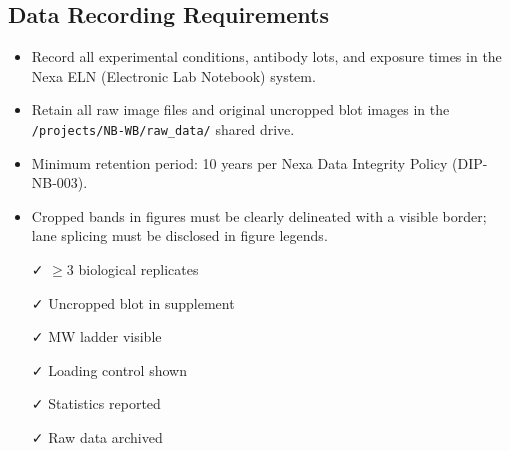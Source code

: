 \begin{minipage}[t]{0.55\textwidth}
\vspace{0pt}
\subsection*{Data Recording Requirements}
\begin{itemize}
  \item Record all experimental conditions, antibody lots, and exposure times
        in the Nexa ELN (Electronic Lab Notebook) system.
  \item Retain all raw image files and original uncropped blot images in
        the \texttt{/projects/NB-WB/raw\_data/} shared drive.
  \item Minimum retention period: 10 years per Nexa Data Integrity Policy
        (DIP-NB-003).
  \item Cropped bands in figures must be clearly delineated with a visible
        border; lane splicing must be disclosed in figure legends.
\end{itemize}
\end{minipage}%
\hfill%
\begin{minipage}[t]{0.41\textwidth}
\vspace{0pt}
\begin{tcolorbox}[
  enhanced,
  colframe=NexaGold,
  colback=WarnAmber,
  colbacktitle=NexaGold,
  coltitle=white,
  arc=4pt,
  boxrule=0.8pt,
  title={\faStar\hspace{4pt}\textbf{Publication Checklist}},
  fonttitle=\small\bfseries,
  left=8pt, right=8pt, top=5pt, bottom=5pt,
]
\small
\begin{itemize}[leftmargin=1em,label={\scriptsize\textcolor{NexaBlue}{\faTimes}}]
  \item[\scriptsize\textcolor{NexaTeal}{\faCheck}] $\geq 3$ biological replicates
  \item[\scriptsize\textcolor{NexaTeal}{\faCheck}] Uncropped blot in supplement
  \item[\scriptsize\textcolor{NexaTeal}{\faCheck}] MW ladder visible
  \item[\scriptsize\textcolor{NexaTeal}{\faCheck}] Loading control shown
  \item[\scriptsize\textcolor{NexaTeal}{\faCheck}] Statistics reported
  \item[\scriptsize\textcolor{NexaTeal}{\faCheck}] Raw data archived
\end{itemize}
\end{tcolorbox}
\end{minipage}
